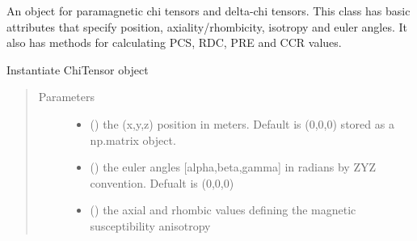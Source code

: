 \documentclass[a4paper,10pt,english]{sphinxmanual}
\begin{document}
\begin{fulllineitems}
\label{\detokenize{reference/generated/paramagpy.metal.Metal:paramagpy.metal.Metal}}
An object for paramagnetic chi tensors and delta-chi tensors.
This class has basic attributes that specify position,
axiality/rhombicity, isotropy and euler angles.
It also has methods for calculating PCS, RDC, PRE and CCR values.

\begin{fulllineitems}
\label{\detokenize{reference/generated/paramagpy.metal.Metal:paramagpy.metal.Metal.__init__}}
Instantiate ChiTensor object
\begin{quote}\begin{description}
\item[{Parameters}] \leavevmode\begin{itemize}
\item {} 
 (\sphinxstyleliteralemphasis{\sphinxupquote{, }}) \textendash{} the (x,y,z) position in meters. Default is (0,0,0)
stored as a np.matrix object.

\item {} 
 (\sphinxstyleliteralemphasis{\sphinxupquote{, }}) \textendash{} the euler angles {[}alpha,beta,gamma{]} in radians
by ZYZ convention. Defualt is (0,0,0)

\item {} 
 (\sphinxstyleliteralemphasis{\sphinxupquote{, }}) \textendash{} the axial and rhombic values defining the magnetic susceptibility
anisotropy


\end{itemize}
\end{description}
\end{quote}
\end{fulllineitems}
\end{fulllineitems}
\end{document}

